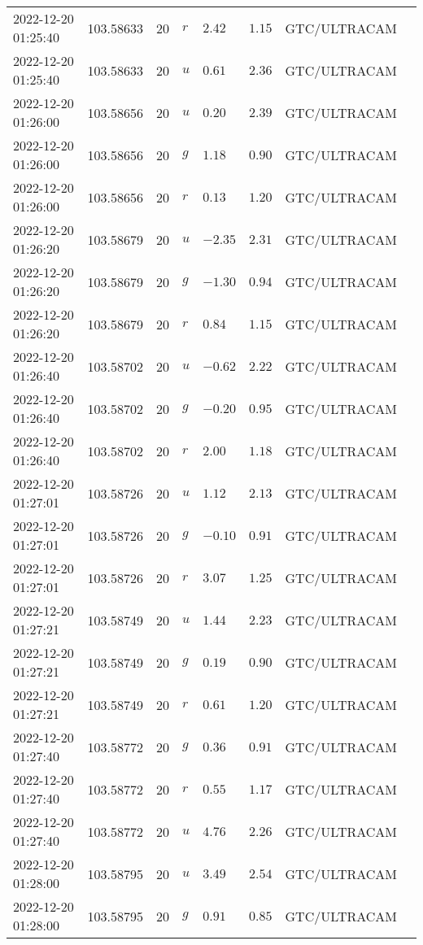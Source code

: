 \documentclass{nature_plusfigure}
\begin{document}
\begin{supplement}
\begin{center}
\begin{longtable}{llllllll}
2022-12-20 01:25:40 & 103.58633 & 20 & $r$ & $2.42$ & $1.15$ & GTC/ULTRACAM &  \\ 
2022-12-20 01:25:40 & 103.58633 & 20 & $u$ & $0.61$ & $2.36$ & GTC/ULTRACAM &  \\ 
2022-12-20 01:26:00 & 103.58656 & 20 & $u$ & $0.20$ & $2.39$ & GTC/ULTRACAM &  \\ 
2022-12-20 01:26:00 & 103.58656 & 20 & $g$ & $1.18$ & $0.90$ & GTC/ULTRACAM &  \\ 
2022-12-20 01:26:00 & 103.58656 & 20 & $r$ & $0.13$ & $1.20$ & GTC/ULTRACAM &  \\ 
2022-12-20 01:26:20 & 103.58679 & 20 & $u$ & $-2.35$ & $2.31$ & GTC/ULTRACAM &  \\ 
2022-12-20 01:26:20 & 103.58679 & 20 & $g$ & $-1.30$ & $0.94$ & GTC/ULTRACAM &  \\ 
2022-12-20 01:26:20 & 103.58679 & 20 & $r$ & $0.84$ & $1.15$ & GTC/ULTRACAM &  \\ 
2022-12-20 01:26:40 & 103.58702 & 20 & $u$ & $-0.62$ & $2.22$ & GTC/ULTRACAM &  \\ 
2022-12-20 01:26:40 & 103.58702 & 20 & $g$ & $-0.20$ & $0.95$ & GTC/ULTRACAM &  \\ 
2022-12-20 01:26:40 & 103.58702 & 20 & $r$ & $2.00$ & $1.18$ & GTC/ULTRACAM &  \\ 
2022-12-20 01:27:01 & 103.58726 & 20 & $u$ & $1.12$ & $2.13$ & GTC/ULTRACAM &  \\ 
2022-12-20 01:27:01 & 103.58726 & 20 & $g$ & $-0.10$ & $0.91$ & GTC/ULTRACAM &  \\ 
2022-12-20 01:27:01 & 103.58726 & 20 & $r$ & $3.07$ & $1.25$ & GTC/ULTRACAM &  \\ 
2022-12-20 01:27:21 & 103.58749 & 20 & $u$ & $1.44$ & $2.23$ & GTC/ULTRACAM &  \\ 
2022-12-20 01:27:21 & 103.58749 & 20 & $g$ & $0.19$ & $0.90$ & GTC/ULTRACAM &  \\ 
2022-12-20 01:27:21 & 103.58749 & 20 & $r$ & $0.61$ & $1.20$ & GTC/ULTRACAM &  \\ 
2022-12-20 01:27:40 & 103.58772 & 20 & $g$ & $0.36$ & $0.91$ & GTC/ULTRACAM &  \\ 
2022-12-20 01:27:40 & 103.58772 & 20 & $r$ & $0.55$ & $1.17$ & GTC/ULTRACAM &  \\ 
2022-12-20 01:27:40 & 103.58772 & 20 & $u$ & $4.76$ & $2.26$ & GTC/ULTRACAM &  \\ 
2022-12-20 01:28:00 & 103.58795 & 20 & $u$ & $3.49$ & $2.54$ & GTC/ULTRACAM &  \\ 
2022-12-20 01:28:00 & 103.58795 & 20 & $g$ & $0.91$ & $0.85$ & GTC/ULTRACAM &  \\ 

\end{longtable}
\end{center}
\end{supplement}
\end{document}

